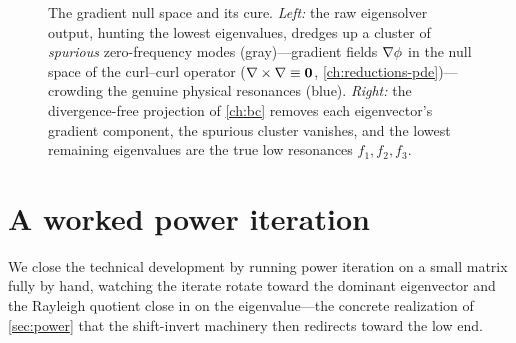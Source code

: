 \begin{figure}[t]
\begin{tikzpicture}
\end{tikzpicture}
\caption[Spurious modes removed by the divergence-free projection]{The gradient
null space and its cure. \emph{Left:} the raw eigensolver output, hunting the
lowest eigenvalues, dredges up a cluster of \emph{spurious} zero-frequency modes
(gray)---gradient fields $\nabla\phi$ in the null space of the curl--curl operator
($\nabla\times\nabla\equiv\mathbf 0$, \cref{ch:reductions-pde})---crowding the genuine
physical resonances (blue). \emph{Right:} the divergence-free projection of
\cref{ch:bc} removes each eigenvector's gradient component, the spurious cluster
vanishes, and the lowest remaining eigenvalues are the true low resonances
$f_1,f_2,f_3$.}
\label{fig:spurious}
\end{figure}

\section{A worked power iteration}
\label{sec:worked-power}

We close the technical development by running power iteration on a small matrix
fully by hand, watching the iterate rotate toward the dominant eigenvector and the
Rayleigh quotient close in on the eigenvalue---the concrete realization of
\cref{sec:power} that the shift-invert machinery then redirects toward the low end.

